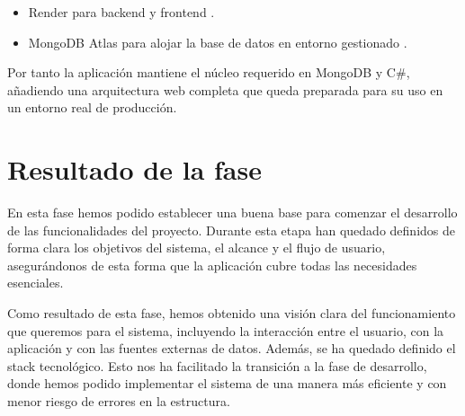 \begin{itemize}
    \item Render para backend y frontend \cite{renderDocs}.
    \item MongoDB Atlas para alojar la base de datos en entorno gestionado \cite{mongoAtlasDocs}.
\end{itemize}

Por tanto la aplicación mantiene el núcleo requerido en MongoDB y C\#, añadiendo una arquitectura web completa que queda preparada para su uso en un entorno real de producción.

\section{Resultado de la fase}

En esta fase hemos podido establecer una buena base para comenzar el desarrollo de las funcionalidades del proyecto. Durante esta etapa han quedado definidos de forma clara los objetivos del sistema, el alcance y el flujo de usuario, asegurándonos de esta forma que la aplicación cubre todas las necesidades esenciales.

Como resultado de esta fase, hemos obtenido una visión clara del funcionamiento que queremos para el sistema, incluyendo la interacción entre el usuario, con la aplicación y con las fuentes externas de datos. Además, se ha quedado definido el stack tecnológico. Esto nos ha facilitado la transición a la fase de desarrollo, donde hemos podido implementar el sistema de una manera más eficiente y con menor riesgo de errores en la estructura.
